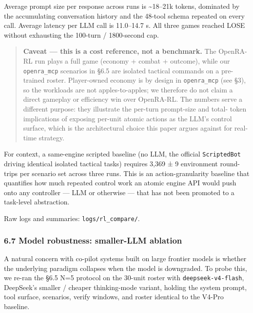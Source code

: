 \documentclass[
  journal]{IEEEtran}
\begin{document}
Average prompt size per response across runs is \textasciitilde18--21k
tokens, dominated by the accumulating conversation history and the
48-tool schema repeated on every call. Average latency per LLM call is
11.0--14.7 s. All three games reached LOSE without exhausting the
100-turn / 1800-second cap.

\begin{quote}
\textbf{Caveat --- this is a cost reference, not a benchmark.} The
OpenRA-RL run plays a full game (economy + combat + outcome), while our
\texttt{openra\_mcp} scenarios in §6.5 are isolated tactical commands on
a pre-trained roster. Player-owned economy is by design in
\texttt{openra\_mcp} (see §3), so the workloads are not
apples-to-apples; we therefore do not claim a direct gameplay or
efficiency win over OpenRA-RL. The numbers serve a different purpose:
they illustrate the per-turn prompt-size and total- token implications
of exposing per-unit atomic actions as the LLM's control surface, which
is the architectural choice this paper argues against for real-time
strategy.
\end{quote}

For context, a same-engine scripted baseline (no LLM, the official
\texttt{ScriptedBot} driving identical isolated tactical tasks) requires
3,369 ± 9 environment round-trips per scenario set across three runs.
This is an action-granularity baseline that quantifies how much repeated
control work an atomic engine API would push onto any controller --- LLM
or otherwise --- that has not been promoted to a task-level abstraction.

Raw logs and summaries: \texttt{logs/rl\_compare/}.

\subsubsection{6.7 Model robustness: smaller-LLM
ablation}\label{model-robustness-smaller-llm-ablation}

A natural concern with co-pilot systems built on large frontier models
is whether the underlying paradigm collapses when the model is
downgraded. To probe this, we re-ran the §6.5 N=5 protocol on the
30-unit roster with \texttt{deepseek-v4-flash}, DeepSeek's smaller /
cheaper thinking-mode variant, holding the system prompt, tool surface,
scenarios, verify windows, and roster identical to the V4-Pro baseline.
\end{document}
